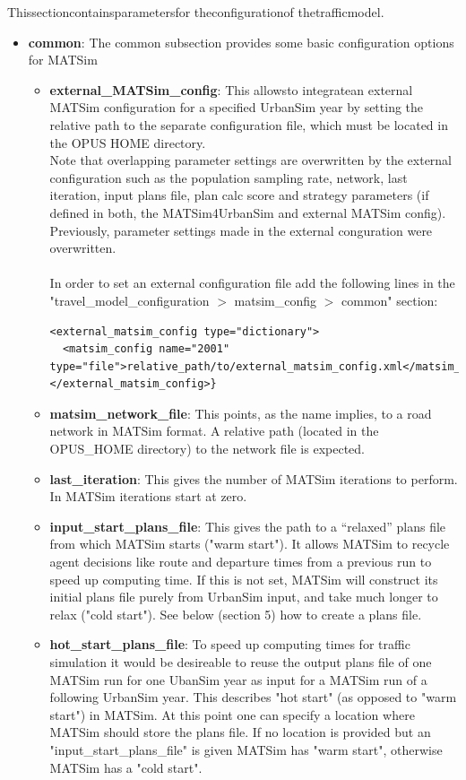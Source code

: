 Thissectioncontainsparametersfor theconfigurationof thetrafficmodel.
\begin{itemize}
	\item \textbf{common}: The common subsection provides some basic configuration options for MATSim   
\begin{itemize}
	\item \textbf{external\_MATSim\_config}: This allowsto integratean external MATSim configuration for a specified UrbanSim year by setting the relative path to the separate configuration file, which must be located in the OPUS HOME directory.
\\Note  that overlapping parameter settings are overwritten by the external  configuration such as the population sampling rate, network, last  iteration, input plans file, plan calc score and strategy parameters (if  defined in both, the MATSim4UrbanSim and external MATSim config).
\\     Previously, parameter settings made in the external conguration were overwritten.
\\
\\     In order to set an external configuration file add the following  lines in the "travel\_model\_configuration $>$ matsim\_config $>$ common"  section:
\\
\begin{verbatim}
<external_matsim_config type="dictionary">
  <matsim_config name="2001" type="file">relative_path/to/external_matsim_config.xml</matsim_config>
</external_matsim_config>}
\end{verbatim}
	\item \textbf{matsim\_network\_file}: This points, as the name  implies, to a road network in MATSim format. A relative path (located in  the OPUS\_HOME directory) to the network file is expected.
	\item \textbf{last\_iteration}: This gives the number of MATSim iterations to perform. In MATSim iterations start at zero.
	\item \textbf{input\_start\_plans\_file}: This gives the path to a  “relaxed” plans file from which MATSim starts ("warm start"). It allows  MATSim to recycle agent decisions like route and departure times from a  previous run to speed up computing time. If this is not set, MATSim  will construct its initial plans file purely from UrbanSim input, and  take much longer to relax ("cold start"). See below (section 5) how to  create a plans file.
	\item \textbf{hot\_start\_plans\_file}: To speed up computing  times for traffic simulation it would be desireable to reuse the output  plans file of one MATSim run for one UbanSim year as input for a MATSim  run of a following UrbanSim year. This describes "hot start" (as opposed  to "warm start") in MATSim. At this point one can specify a location  where MATSim should store the plans file. If no location is  provided but an "input\_start\_plans\_file" is given MATSim has "warm  start", otherwise MATSim has a "cold start".

\end{itemize}
\end{itemize}
